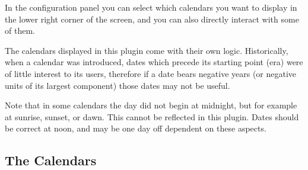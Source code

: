 In the configuration panel you can select which calendars you want to
display in the lower right corner of the screen, and you can also directly
interact with some of them.

The calendars displayed in this plugin come with their own
logic. Historically, when a calendar was introduced, dates which
precede its starting point (era) were of little interest to its users,
therefore if a date bears negative years (or negative units of its
largest component) those dates may not be useful.

Note that in some calendars the day did not begin at midnight, but for
example at sunrise, sunset, or dawn. This cannot be reflected in this
plugin. Dates should be correct at noon, and may be one day off
dependent on these aspects.

\subsection{The Calendars}
